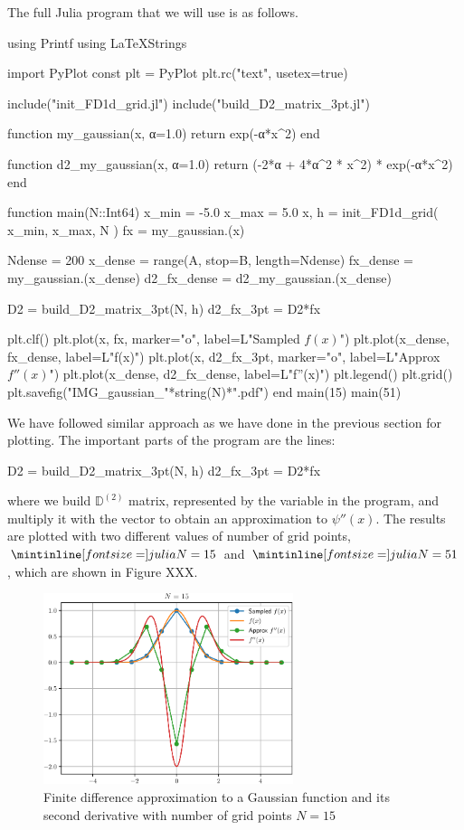 The full Julia program that we will use is as follows.
\begin{juliacode}
using Printf
using LaTeXStrings

import PyPlot
const plt = PyPlot
plt.rc("text", usetex=true)

include("init_FD1d_grid.jl")
include("build_D2_matrix_3pt.jl")

function my_gaussian(x, α=1.0)
  return exp(-α*x^2)
end

function d2_my_gaussian(x, α=1.0)
  return (-2*α + 4*α^2 * x^2) * exp(-α*x^2)
end

function main(N::Int64)
  x_min = -5.0
  x_max =  5.0
  x, h = init_FD1d_grid( x_min, x_max, N )
  fx = my_gaussian.(x)

  Ndense = 200
  x_dense = range(A, stop=B, length=Ndense)
  fx_dense = my_gaussian.(x_dense)
  d2_fx_dense = d2_my_gaussian.(x_dense)

  D2 = build_D2_matrix_3pt(N, h)
  d2_fx_3pt = D2*fx

  plt.clf()
  plt.plot(x, fx, marker="o", label=L"Sampled $f(x)$")
  plt.plot(x_dense, fx_dense, label=L"f(x)")
  plt.plot(x, d2_fx_3pt, marker="o", label=L"Approx $f''(x)$")
  plt.plot(x_dense, d2_fx_dense, label=L"f''(x)")
  plt.legend()
  plt.grid()
  plt.savefig("IMG_gaussian_"*string(N)*".pdf")
end
main(15)
main(51)
\end{juliacode}

We have followed similar approach as we have done in the previous section for plotting.
The important parts of the program are the lines:
\begin{juliacode}
D2 = build_D2_matrix_3pt(N, h)
d2_fx_3pt = D2*fx
\end{juliacode}
where we build $\mathbb{D}^{(2)}$ matrix, represented by the variable
 in the program, and multiply it with the vector 
to obtain an approximation to $\psi''(x)$. The results are plotted with two
different values of number of grid points, $\jlinline{N=15}$ and $\jlinline{N=51}$,
which are shown in Figure XXX.

\begin{figure}[H]
{\center
\includegraphics[width=0.65\textwidth]{../codes/FD1d/IMG_gaussian_15.pdf}
\par}
\caption{Finite difference approximation to a Gaussian function and its second derivative with
number of grid points $N=15$}
\end{figure}

